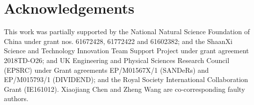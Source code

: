 \section*{Acknowledgements}
This work was partially supported by the National Natural Science Foundation of China under grant nos. 61672428, 61772422 and 61602382; and
the ShaanXi Science and Technology Innovation Team Support Project under grant agreement 2018TD-O26; and UK Engineering and Physical
Sciences Research Council (EPSRC) under Grant agreements EP/M01567X/1 (SANDeRs) and EP/M015793/1 (DIVIDEND); and the Royal Society
International Collaboration Grant (IE161012). Xiaojiang Chen and Zheng Wang are co-corresponding faulty authors.
